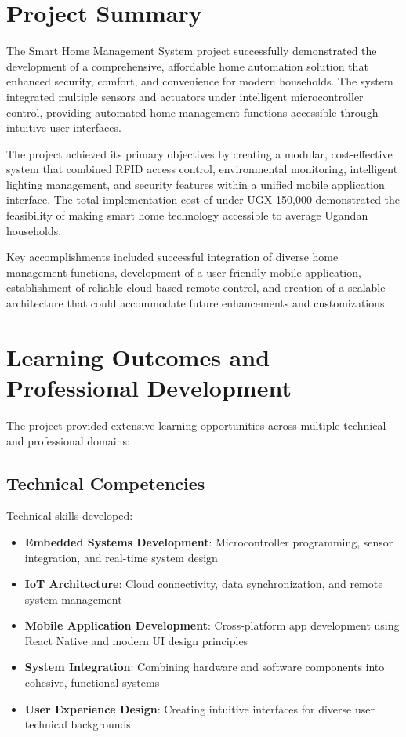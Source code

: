 \documentclass[12pt,a4paper]{report}
\begin{document}
\section{Project Summary}

\noindent The Smart Home Management System project successfully demonstrated the development of a comprehensive, affordable home automation solution that enhanced security, comfort, and convenience for modern households. The system integrated multiple sensors and actuators under intelligent microcontroller control, providing automated home management functions accessible through intuitive user interfaces.

\noindent The project achieved its primary objectives by creating a modular, cost-effective system that combined RFID access control, environmental monitoring, intelligent lighting management, and security features within a unified mobile application interface. The total implementation cost of under UGX 150,000 demonstrated the feasibility of making smart home technology accessible to average Ugandan households.

\noindent Key accomplishments included successful integration of diverse home management functions, development of a user-friendly mobile application, establishment of reliable cloud-based remote control, and creation of a scalable architecture that could accommodate future enhancements and customizations.

\section{Learning Outcomes and Professional Development}

\noindent The project provided extensive learning opportunities across multiple technical and professional domains:

\subsection{Technical Competencies}
\noindent Technical skills developed:
\begin{itemize}
\item \textbf{Embedded Systems Development}: Microcontroller programming, sensor integration, and real-time system design
\item \textbf{IoT Architecture}: Cloud connectivity, data synchronization, and remote system management
\item \textbf{Mobile Application Development}: Cross-platform app development using React Native and modern UI design principles
\item \textbf{System Integration}: Combining hardware and software components into cohesive, functional systems
\item \textbf{User Experience Design}: Creating intuitive interfaces for diverse user technical backgrounds
\end{itemize}
\end{document}

